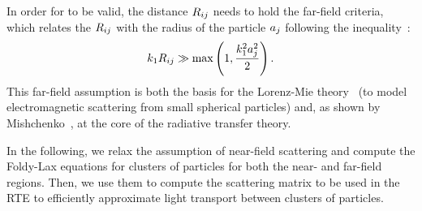 In order for  to be valid, the distance $R_{ij}$ needs to hold the far-field criteria, which relates the $R_{ij}$ with the radius of the particle $a_j$ following the inequality~\cite{mishchenko2006multiple}:
%
\begin{equation}
    k_1 R_{ij} \gg \max\left(1, \frac{k_1^2a_j^2}{2}\right).
    \label{eq:farfield}
\end{equation}
%
This far-field assumption is both the basis for the Lorenz-Mie theory~\cite{hulst1981light} (to model electromagnetic scattering from small spherical particles) and, as shown by Mishchenko~, at the core of the radiative transfer theory.

In the following, we relax the assumption of near-field scattering and compute the Foldy-Lax equations for clusters of particles for both the near- and far-field regions. Then, we use them to compute the scattering matrix to be used in the RTE to efficiently approximate light transport between clusters of particles. 




